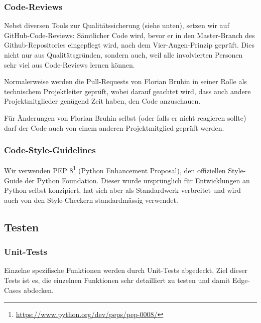 \documentclass[a4paper]{article}
\begin{document}
\subsubsection{Code-Reviews}
\label{sec:codereviews}

Nebst diversen Tools zur Qualitätssicherung (siehe unten), setzen wir auf GitHub-Code-Reviews: Sämtlicher Code wird, bevor er in den Master-Branch des
Github-Repositories eingepflegt wird, nach dem Vier-Augen-Prinzip geprüft. Dies
nicht nur aus Qualitätsgründen, sondern auch, weil alle involvierten Personen
sehr viel aus Code-Reviews lernen können.

Normalerweise werden die Pull-Requests von Florian Bruhin in seiner Rolle als
technischem Projektleiter geprüft, wobei darauf geachtet wird, dass auch andere
Projektmitglieder genügend Zeit haben, den Code anzuschauen.

Für Änderungen von Florian Bruhin selbst (oder falls er nicht reagieren sollte)
darf der Code auch von einem anderen Projektmitglied geprüft werden.

\subsubsection{Code-Style-Guidelines}
Wir verwenden PEP 8\footnote{\url{https://www.python.org/dev/peps/pep-0008/}}
(Python Enhancement Proposal), den offiziellen Style-Guide der Python
Foundation. Dieser wurde ursprünglich für Entwicklungen an Python selbst
konzipiert, hat sich aber als Standardwerk verbreitet und wird auch von den
Style-Checkern standardmässig verwendet.

\subsection{Testen}

\subsubsection{Unit-Tests}

Einzelne spezifische Funktionen werden durch Unit-Tests abgedeckt.
Ziel dieser Tests ist es, die einzelnen Funktionen sehr detailliert zu testen und damit Edge-Cases abdecken.
\end{document}

